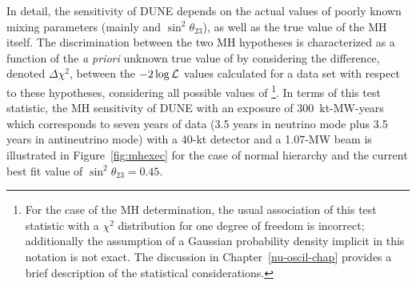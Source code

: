 In detail, the sensitivity of DUNE depends on the actual values of
poorly known mixing parameters (mainly \deltacp and
$\sin^2{\theta_{23}}$), as well as the true value of the MH itself.
The discrimination between the two MH hypotheses is characterized as a
function of the \emph{a priori} unknown true value of \deltacp by
considering the difference, denoted $\Delta \chi^2$, between the
$-2\log{\cal L}$ values calculated for a data set with respect to
these hypotheses, considering all possible values of
\deltacp\footnote{For the case of the MH determination, the usual
  association of this test statistic with a $\chi^2$ distribution for
  one degree of freedom is incorrect; additionally the assumption of a
  Gaussian probability density %
  implicit in this notation is not exact.  The discussion in
  Chapter~\ref{nu-oscil-chap} provides a brief description of the
  statistical considerations.}.  In terms of this test statistic, the
MH sensitivity of DUNE with an exposure of 300~kt-MW-years which
corresponds to seven years of data (3.5 years in neutrino mode plus
3.5 years in antineutrino mode) with a 40-kt detector and a 1.07-MW
beam is illustrated in Figure~\ref{fig:mhexec} for the case of normal
hierarchy and the current best fit value of $\sin^2 \theta_{23} = 0.45$.
%
